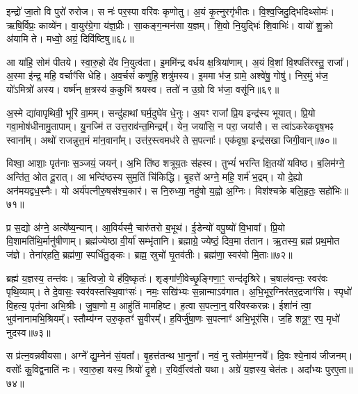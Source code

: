 इन्द्रो॑ जा॒तो वि पुरो॑ रुरोज।
स नः॑ पर॒स्पा वरि॑वः कृणोतु।
अ॒यं कृ॒त्नुरगृ॑भीतः।
वि॒श्व॒जिदु॒द्भिदिथ्सोमः॑।
ऋषि॒र्विप्रः॒ काव्ये॑न।
वा॒युर॑ग्रे॒गा य॑ज्ञ॒प्रीः।
सा॒कङ्ग॒न्मन॑सा य॒ज्ञम्।
शि॒वो नि॒युद्भिः॑ शि॒वाभिः॑।
वायो॑ शु॒क्रो अ॑यामि ते।
मध्वो॒ अग्रं॒ दिवि॑ष्टिषु॥६८॥

आ या॑हि॒ सोम॑ पीतये।
स्वा॒रु॒हो दे॑व नि॒युत्व॑ता।
इ॒ममि॑न्द्र वर्धय क्ष॒त्रिया॑णाम्।
अ॒यं वि॒शां वि॒श्पति॑रस्तु॒ राजा᳚।
अ॒स्मा इ॑न्द्र॒ महि॒ वर्चाꣳ॑सि धेहि।
अ॒व॒र्चसं॑ कणुहि॒ शत्रु॑मस्य।
इ॒ममा भ॑ज॒ ग्रामे॒ अश्वे॑षु॒ गोषु॑।
निर॒मुं भ॑ज॒ यो॑\-ऽमित्रो॑ अस्य।
वर्ष्म॑न् क्ष॒त्रस्य॑ क॒कुभि॑ श्रयस्व।
ततो॑ न उ॒ग्रो वि भ॑जा॒ वसू॑नि॥६९॥

अ॒स्मे द्या॑वापृथिवी॒ भूरि॑ वा॒मम्।
सन्दु॑हाथां घर्म॒दुघे॑व धे॒नुः।
अ॒यꣳ राजा᳚ प्रि॒य इन्द्र॑स्य भूयात्।
प्रि॒यो गवा॒मोष॑धीनामु॒तापाम्।
यु॒नज्मि॑ त उत्त॒राव॑न्त॒मिन्द्रम्᳚।
येन॒ जया॑सि॒ न परा॒ जया॑सै।
स त्वा॑\-ऽकरेकवृष॒भꣴ स्वाना᳚म्।
अथो॑ राजन्नुत्त॒मं मा॑न॒वाना᳚म्।
उत्त॑र॒स्त्वमध॑रे ते स॒पत्नाः᳚।
एक॑वृषा॒ इन्द्र॑सखा जिगी॒वान्॥७०॥

विश्वा॒ आशाः॒ पृत॑नाः स॒ञ्जयं॒ जयन्॑।
अ॒भि ति॑ष्ठ शत्रूय॒तः स॑हस्व।
तुभ्यं॑ भरन्ति क्षि॒तयो॑ यविष्ठ।
ब॒लिम॑ग्ने॒ अन्ति॑त॒ ओत दू॒रात्।
आ भन्दि॑ष्ठस्य सुम॒तिं चि॑किद्धि।
बृ॒हत्ते॑ अग्ने॒ महि॒ शर्म॑ भ॒द्रम्।
यो दे॒ह्यो अन॑मयद्वध॒स्नैः।
यो अर्य॑पत्नीरु॒षस॑श्च॒कार॑।
स नि॒रुध्या॒ नहु॑षो य॒ह्वो अ॒ग्निः।
विश॑श्चक्रे बलि॒हृतः॒ सहो॑भिः॥७१॥

प्र स॒द्यो अ॑ग्ने॒ अत्ये᳚ष्य॒न्यान्।
आ॒विर्यस्मै॒ चारु॑तरो ब॒भूथ॑।
ई॒डेन्यो॑ वपु॒ष्यो॑ वि॒भावा᳚।
प्रि॒यो वि॒शामति॑थि॒र्मानु॑षीणाम्।
ब्रह्म॑ज्येष्ठा वी॒र्या॑ सम्भृ॑तानि।
ब्रह्माग्रे॒ ज्येष्ठं॒ दिव॒मा त॑तान।
ऋ॒तस्य॒ ब्रह्म॑ प्रथ॒मोत ज॑ज्ञे।
तेना॑र्‌\mbox{}हति॒ ब्रह्म॑णा॒ स्पर्धि॑तु॒ङ्कः।
ब्रह्म॒ स्रुचो॑ घृ॒तव॑तीः।
ब्रह्म॑णा॒ स्वर॑वो मि॒ताः॥७२॥

ब्रह्म॑ य॒ज्ञस्य॒ तन्त॑वः।
ऋ॒त्विजो॒ ये ह॑वि॒ष्कृतः॑।
शृङ्गा॑णी॒वेच्छृ॒ङ्गिणा॒ꣳ॒ सन्द॑दृश्रिरे।
च॒षाल॑वन्तः॒ स्वर॑वः पृथि॒व्याम्।
ते दे॒वासः॒ स्वर॑वस्तस्थि॒वाꣳसः॑।
नमः॒ सखि॑भ्यः स॒न्नान्मा\-ऽव॑गात।
अ॒भि॒भूर॒ग्निर॑तर॒द्रजाꣳ॑सि।
स्पृधो॑ वि॒हत्य॒ पृत॑ना अभि॒श्रीः।
जु॒षा॒णो म॒ आहु॑तिं मामहिष्ट।
ह॒त्वा स॒पत्ना॒न्॒ वरि॑वस्करन्नः।
ईशा॑नं त्वा॒ भुव॑नानामभि॒श्रियम्᳚।
स्तौम्य॑ग्न उरु॒कृतꣳ॑ सु॒वीरम्᳚।
ह॒विर्जु॑षा॒णः स॒पत्नाꣳ॑ अभि॒भूर॑सि।
ज॒हि शत्रू॒ꣳ॒ रप॒ मृधो॑ नुदस्व॥७३॥\anuvakamend[वि॒शां ज॑यामसि जीरदानो॒ हर्या॒ विश्वा॒ दिवि॑ष्टिषु॒ वसू॑नि जिगी॒वान्थ्सहो॑भिर्मि॒ता न॑श्च॒त्वारि॑ च]

स प्र॑त्न॒वन्नवी॑यसा।
अग्ने᳚ द्यु॒म्नेन॑ सं॒यता᳚।
बृ॒हत्त॑तन्थ भा॒नुना᳚।
नवं॒ नु स्तोम॑म॒ग्नये᳚।
दि॒वः श्ये॒नाय॑ जीजनम्।
वसोः᳚ कु॒विद्व॒नाति॑ नः।
स्वा॒रु॒हा यस्य॒ श्रियो॑ दृ॒शे।
र॒यिर्वी॒रव॑तो यथा।
अग्रे॑ य॒ज्ञस्य॒ चेत॑तः।
अदा᳚भ्यः पुरए॒ता॥७४॥


